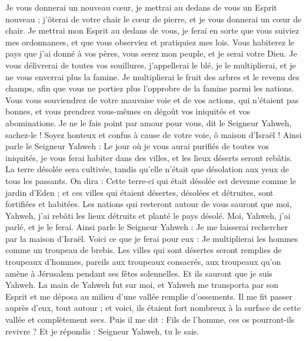 \begin{multicols}{2}
Je vous donnerai un nouveau cœur, je mettrai au dedans de vous un Esprit nouveau ; j'ôterai de votre chair le cœur de pierre, et je vous donnerai un cœur de chair.
Je mettrai mon Esprit au dedans de vous, je ferai en sorte que vous suiviez mes ordonnances, et que vous observiez et pratiquiez mes lois.
Vous habiterez le pays que j'ai donné à vos pères, vous serez mon peuple, et je serai votre Dieu.
Je vous délivrerai de toutes vos souillures, j'appellerai le blé, je le multiplierai, et je ne vous enverrai plus la famine.
Je multiplierai le fruit des arbres et le revenu des champs, afin que vous ne portiez plus l'opprobre de la famine parmi les nations.
Vous vous souviendrez de votre mauvaise voie et de vos actions, qui n'étaient pas bonnes, et vous prendrez vous-mêmes en dégoût vos iniquités et vos abominations.
Je ne le fais point par amour pour vous, dit le Seigneur Yahweh, sachez-le ! Soyez honteux et confus à cause de votre voie, ô maison d'Israël !
Ainsi parle le Seigneur Yahweh : Le jour où je vous aurai purifiés de toutes vos iniquités, je vous ferai habiter dans des villes, et les lieux déserts seront rebâtis.
La terre désolée sera cultivée, tandis qu'elle n'était que désolation aux yeux de tous les passants.
On dira : Cette terre-ci qui était désolée est devenue comme le jardin d'Eden ; et ces villes qui étaient désertes, désolées et détruites, sont fortifiées et habitées.
Les nations qui resteront autour de vous sauront que moi, Yahweh, j'ai rebâti les lieux détruits et planté le pays désolé. Moi, Yahweh, j'ai parlé, et je le ferai.
Ainsi parle le Seigneur Yahweh : Je me laisserai rechercher par la maison d'Israël. Voici ce que je ferai pour eux : Je multiplierai les hommes comme un troupeau de brebis.
Les villes qui sont désertes seront remplies de troupeaux d'hommes, pareils aux troupeaux consacrés, aux troupeaux qu'on amène à Jérusalem pendant ses fêtes solennelles. Et ils sauront que je suis Yahweh.
\VerseOne{}La main de Yahweh fut sur moi, et Yahweh me transporta par son Esprit et me déposa au milieu d'une vallée remplie d'ossements.
Il me fit passer auprès d'eux, tout autour ; et voici, ils étaient fort nombreux à la surface de cette vallée et complètement secs.
Puis il me dit : Fils de l'homme, ces os pourront-ils revivre ? Et je répondis : Seigneur Yahweh, tu le sais.

\end{multicols}
